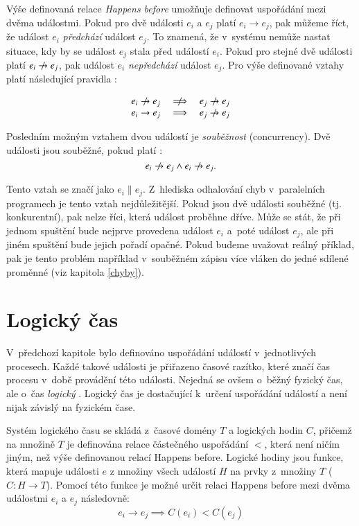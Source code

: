 Výše definovaná relace \textit{Happens before} umožňuje definovat uspořádání mezi dvěma událostmi. Pokud pro dvě události $e_i$ a $e_j$ platí $e_i \rightarrow e_j$, pak můžeme říct, že událost $e_i$ \textit{předchází} událost $e_j$.
To znamená, že v~systému nemůže nastat situace, kdy by se událost $e_j$ stala před událostí $e_i$. Pokud pro stejné dvě události platí $e_i \centernot\rightarrow e_j$, pak událost $e_i$ \textit{nepředchází} událost $e_j$. Pro výše definované vztahy platí následující pravidla \cite{cite:PDI}:

$$
\begin{array}{lcr}
e_i \centernot\rightarrow e_j & \centernot\implies & e_j \centernot\rightarrow e_j \\
e_i \rightarrow e_j & \implies & e_j \centernot\rightarrow e_j
\end{array}
$$

Posledním možným vztahem dvou událostí je \textit{souběžnost} (concurrency). Dvě události jsou souběžné, pokud platí \cite{cite:PDI}:
$$e_i \centernot\rightarrow e_j \wedge e_i \centernot\rightarrow e_j.$$

Tento vztah se značí jako $e_i \parallel e_j$. Z~hlediska odhalování chyb v~paralelních programech je tento vztah nejdůležitější. Pokud jsou dvě události souběžné (tj. konkurentní), pak nelze říci, která událost proběhne dříve. Může se stát, že při jednom spuštění bude nejprve provedena událost $e_i$ a~poté událost $e_j$, ale při jiném spuštění bude jejich pořadí opačné. Pokud budeme uvažovat reálný příklad, pak je tento problém například v~souběžném zápisu více vláken do jedné sdílené proměnné (viz kapitola \ref{chyby}). 

\section{Logický čas}\label{logic-time}

V~předchozí kapitole bylo definováno uspořádání událostí v~jednotlivých procesech. Každé takové události je přiřazeno časové razítko, které značí čas procesu v~době provádění této události. Nejedná se ovšem o~běžný fyzický čas, ale o~čas \textit{logický} \cite{cite:HB}. Logický čas je dostačující k~určení uspořádání událostí a není nijak závislý na fyzickém čase.

Systém logického času se skládá z~časové domény $T$ a logických hodin $C$, přičemž na množině $T$ je definována relace částečného uspořádání $<$, která není ničím jiným, než výše definovanou relací Happens before. Logické hodiny jsou funkce, která mapuje události $e$ z množiny všech událostí $H$ na prvky z~množiny $T$ ($C : H \rightarrow T$). Pomocí této funkce je možné určit relaci Happens before mezi dvěma událostmi $e_i$ a $e_j$ následovně:
$$e_i \rightarrow e_j \implies C(e_i) < C(e_j)$$

